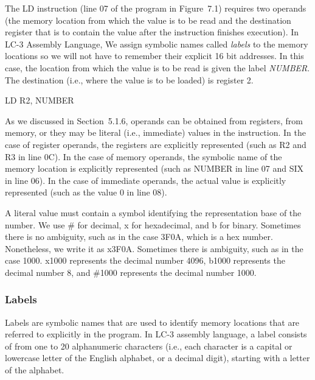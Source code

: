 \documentclass{patt}
\begin{document}
The LD instruction (line 07 of the program in Figure~7.1) requires two operands 
(the memory location from which the value is to be read and the destination
register that is to contain the value after the instruction finishes 
execution).  In LC-3 Assembly Language, We assign symbolic names called {\em labels} 
to the memory locations so we will not have to remember their explicit 16 bit 
addresses.  In this case, the location from which  the value is to 
be read is given the label {\em NUMBER}.  The destination (i.e., where 
the value is to be loaded) is register 2.
\begin{colorverbatim}
LD   R2, NUMBER
\end{colorverbatim}
As we discussed in Section~5.1.6, operands can be obtained from
registers, from memory, or they may be literal (i.e., immediate)
values in the instruction.  In the case of register operands, the
registers are explicitly represented (such as R2 and R3 in line 0C).
In the case of memory operands, the symbolic name of the memory
location is explicitly represented (such as NUMBER in line 07 and SIX
in line 06).  In the case of immediate operands, the actual value is
explicitly represented (such as the value 0 in line 08).
A literal value must contain a symbol identifying the representation
base  of the number.  We use \# for decimal, x for
hexadecimal, and b for binary.  Sometimes there is no ambiguity, such
as in the case 3F0A, which 
  is a hex
number.  Nonetheless, we write it as x3F0A.  Sometimes there is
ambiguity, such as in the case 1000.  x1000 represents the decimal
number 4096, b1000 represents the decimal number 8, and \#1000
represents the decimal number 1000.

\subsubsection{Labels}

Labels are symbolic names that are used to identify memory locations
that are referred to explicitly in the program.  In LC-3 assembly
language, a label consists of from one to 20 alphanumeric characters
(i.e., each character is a capital or lowercase letter of the English 
alphabet, or a decimal digit), starting with a letter of the alphabet.  
\end{document}

